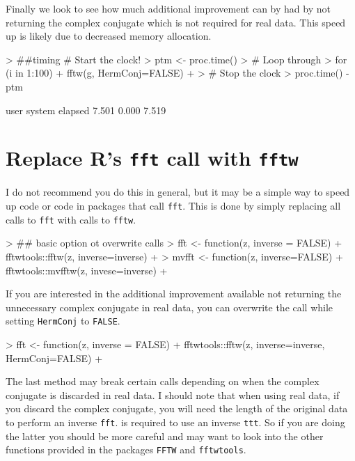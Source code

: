 \documentclass{article}
\begin{document}
Finally we look to see how much additional improvement can by had by not returning the complex conjugate which is not required for real data. This speed up is likely due to decreased memory allocation. 

\begin{Schunk}
\begin{Sinput}
> ##timing # Start the clock!
> ptm <- proc.time()
> # Loop through 
> for (i in 1:100){
+     fftw(g, HermConj=FALSE)
+ }
> # Stop the clock
> proc.time() - ptm
\end{Sinput}
\begin{Soutput}
   user  system elapsed 
  7.501   0.000   7.519 
\end{Soutput}
\end{Schunk}


\section{Replace R's \texttt{fft} call with \texttt{fftw}}

I do not recommend you do this in general, but it may be a simple way to speed up code or code in packages that call \texttt{fft}. This is done by simply replacing all calls to \texttt{fft} with calls to \texttt{fftw}. 

\begin{Schunk}
\begin{Sinput}
> ## basic option ot overwrite calls
> fft <- function(z, inverse = FALSE) {
+     fftwtools::fftw(z, inverse=inverse)
+ }
> mvfft <- function(z, inverse=FALSE) {
+     fftwtools::mvfftw(z, invese=inverse)
+ }
\end{Sinput}
\end{Schunk}


If you are interested in the additional improvement available not returning the unnecessary complex conjugate in real data, you can overwrite the call while setting \texttt{HermConj} to \texttt{FALSE}.

\begin{Schunk}
\begin{Sinput}
> fft <- function(z, inverse = FALSE) {
+     fftwtools::fftw(z, inverse=inverse, HermConj=FALSE)
+ }
\end{Sinput}
\end{Schunk}

The last method may break certain calls depending on when the complex conjugate is discarded in real data. I should note that when using real data, if you discard the complex conjugate, you will need the length of the original data to perform an inverse \texttt{fft}. is required to use an inverse \texttt{ttt}. So if you are doing the latter you should be more careful and may want to look into the other functions provided in the packages \texttt{FFTW} and \texttt{fftwtools}.
\end{document}
